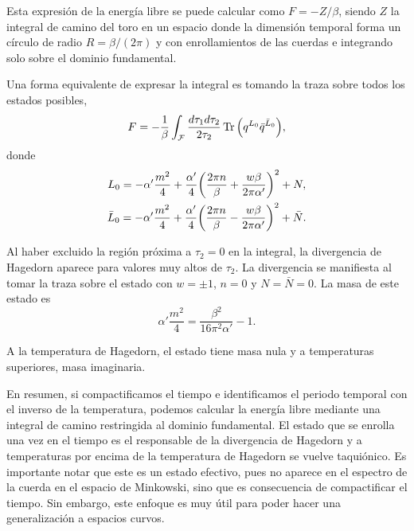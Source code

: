 Esta expresión de la energía libre se puede calcular como $F=-Z/\beta$, siendo $Z$ la integral de camino del toro en
un espacio donde la dimensión temporal forma un círculo de radio $R=\beta/(2\pi)$ y con enrollamientos
de las cuerdas e integrando solo sobre el dominio fundamental.

Una forma equivalente de expresar la integral es tomando la traza sobre todos los estados posibles,
\begin{equation}
  F =-\frac{1}{\beta} \int_{\mathcal F} \frac{d\tau_1 d\tau_2}{2\tau_2} \Tr\qty(q^{L_0} \bar q^{\bar L_0}),
\end{equation}
donde 
\begin{equation}
  \begin{gathered}
         L_0 =  -\alpha'\frac{m^2}{4} + \frac{\alpha'}{4}\qty(\frac{2\pi n}{\beta} + \frac{w\beta}{2\pi\alpha'})^2 + N,\\
    \bar L_0 =  -\alpha'\frac{m^2}{4} + \frac{\alpha'}{4}\qty(\frac{2\pi n}{\beta} - \frac{w\beta}{2\pi\alpha'})^2 +\bar N.
  \end{gathered}
\end{equation}

Al haber excluido la región próxima a $\tau_2=0$ en la integral, la divergencia de Hagedorn aparece para
valores muy altos de $\tau_2$.
La divergencia se manifiesta al tomar la traza sobre el estado con $w=\pm 1$, $n=0$ y $N=\bar N=0$.
La masa de este estado es
\begin{equation}
  \alpha' \frac{m^2}{4} = \frac{\beta^2}{16\pi^2\alpha'} -1.
\end{equation}

A la temperatura de Hagedorn, el estado tiene masa nula y a temperaturas superiores, masa
imaginaria.

En resumen, si compactificamos el tiempo e identificamos el periodo temporal con el inverso de la
temperatura, podemos calcular la energía libre mediante una integral de camino restringida
al dominio fundamental.
El estado que se enrolla una vez en el tiempo es el responsable de la divergencia de Hagedorn y
a temperaturas por encima de la temperatura de Hagedorn se vuelve taquiónico.
Es importante notar que este es un estado efectivo, pues no aparece en el espectro de la cuerda en 
el espacio de Minkowski, sino que es consecuencia de compactificar el tiempo.
Sin embargo, este enfoque es muy útil para poder hacer una generalización a espacios curvos.
